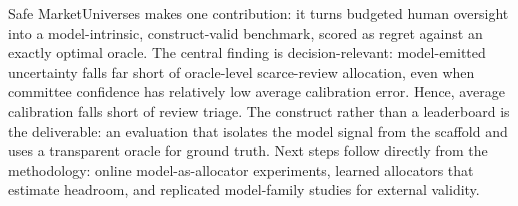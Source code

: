 \documentclass[10pt,twocolumn]{article}
\begin{document}
Safe MarketUniverses makes one contribution: it turns budgeted human oversight into a model-intrinsic, construct-valid benchmark, scored as regret against an exactly optimal oracle. The central finding is decision-relevant: model-emitted uncertainty falls far short of oracle-level scarce-review allocation, even when committee confidence has relatively low average calibration error. Hence, average calibration falls short of review triage. The construct rather than a leaderboard is the deliverable: an evaluation that isolates the model signal from the scaffold and uses a transparent oracle for ground truth. Next steps follow directly from the methodology: online model-as-allocator experiments, learned allocators that estimate headroom, and replicated model-family studies for external validity.

\FloatBarrier



\end{document}
